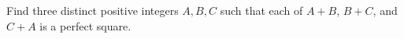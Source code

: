 Find three distinct positive integers $A,B,C$ such that each of $A+B$, $B+C$, and $C+A$ is a perfect square.
